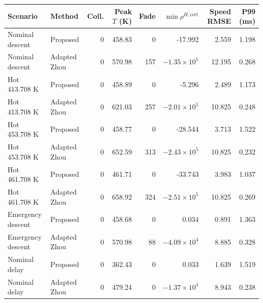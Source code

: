 \begin{tabular}{llrrrrrr}
\toprule
Scenario & Method & Coll. & Peak $T$ (K) & Fade & $\min\rho^{H,\mathrm{cert}}$ & Speed RMSE & P99 (ms) \\
\midrule
Nominal descent & Proposed & 0 & 458.83 & 0 & -17.992 & 2.559 & 1.198 \\
Nominal descent & Adapted Zhou & 0 & 570.98 & 157 & $-1.35\times10^{5}$ & 12.195 & 0.268 \\
\addlinespace[1pt]
Hot 413.708 K & Proposed & 0 & 458.89 & 0 & -5.296 & 2.489 & 1.173 \\
Hot 413.708 K & Adapted Zhou & 0 & 621.03 & 257 & $-2.01\times10^{5}$ & 10.825 & 0.248 \\
\addlinespace[1pt]
Hot 453.708 K & Proposed & 0 & 458.77 & 0 & -28.544 & 3.713 & 1.522 \\
Hot 453.708 K & Adapted Zhou & 0 & 652.59 & 313 & $-2.43\times10^{5}$ & 10.825 & 0.232 \\
\addlinespace[1pt]
Hot 461.708 K & Proposed & 0 & 461.71 & 0 & -33.743 & 3.983 & 1.037 \\
Hot 461.708 K & Adapted Zhou & 0 & 658.92 & 324 & $-2.51\times10^{5}$ & 10.825 & 0.269 \\
\addlinespace[1pt]
Emergency descent & Proposed & 0 & 458.68 & 0 & 0.034 & 0.891 & 1.363 \\
Emergency descent & Adapted Zhou & 0 & 570.98 & 88 & $-4.09\times10^{4}$ & 8.885 & 0.328 \\
\addlinespace[1pt]
Nominal delay & Proposed & 0 & 362.43 & 0 & 0.033 & 1.639 & 1.519 \\
Nominal delay & Adapted Zhou & 0 & 479.24 & 0 & $-1.37\times10^{4}$ & 8.943 & 0.238 \\
\bottomrule
\end{tabular}
